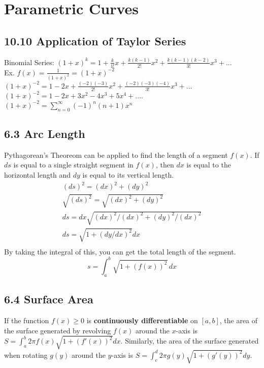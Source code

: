 \documentclass{article}
\begin{document}
    \section{Parametric Curves}
        \color{WildStrawberry}
        \subsection*{10.10 Application of Taylor Series}
            Binomial Series: $(1+x)^k = 1 + \frac{k}{1!}x + \frac{k(k-1)}{2!}x^2 + \frac{k(k-1)(k-2)}{3!}x^3 + ...$ \\
            Ex. $f(x) = \frac{1}{(1+x)^2} = (1+x)^{-2}$ \\
            $(1+x)^{-2} = 1 - 2x + \frac{(-2)(-3)}{2!}x^2  + \frac{(-2)(-3)(-4)}{3!}x^3 + ...$ \\
            $(1+x)^{-2} = 1 - 2x  + 3x^2 - 4x^3 + 5x^4 + ....$ \\
            $(1+x)^{-2} = \sum_{n=0}^{\infty} (-1)^n(n+1)x^n$ \\
        \color{OliveGreen}
        \subsection*{6.3 Arc Length}
            Pythagorean's Theoreom can be applied to find the length of a segment \(f(x)\).
            If \(ds\) is equal to a single straight segment in \(f(x)\), then  \(dx\) is equal to the horizontal length and \(dy\) is equal to its vertical length. 
            \begin{equation}
                \begin{split}
                    (ds)^2 = (dx)^2 + (dy)^2 \\
                    \sqrt{(ds)^2} = \sqrt{(dx)^2 + (dy)^2}\\
                    ds = dx  \sqrt{(dx)^2 / (dx)^2 + (dy)^2 / (dx) ^2}\\
                    ds = \sqrt{1 + (dy/dx)^2}dx\\
                \end{split}
            \end{equation}
            By taking the integral of this, you can get the total length of the segment.
            \begin{equation}
                s = \int_a^b \sqrt{1 + (f(x))^2} \, dx
            \end{equation}
        \color{Blue}
        \subsection*{6.4 Surface Area}
            If the function $f(x) \geq 0$ is \textbf{continuously differentiable} on $[a, b]$, the area of the surface generated by revolving $f(x)$ around the $x$-axis is $S = \int_{a}^{b} 2 \pi f(x) \sqrt{1 + (f'(x))^2} dx$. Similarly, the area of the surface generated when rotating $g(y)$ around the $y$-axis is $S = \int_{c}^{d} 2 \pi g(y) \sqrt{1 + (g'(y))^2} dy$.
        \color{Thistle}
\end{document}
